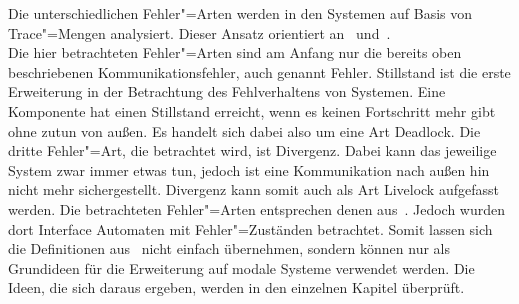 Die unterschiedlichen Fehler"=Arten werden in den Systemen auf Basis von
Trace"=Mengen analysiert. Dieser Ansatz orientiert an~\cite{Vogler2014EIO}
und~\cite{Schinko2016BA}.\\
Die hier betrachteten Fehler"=Arten sind am Anfang nur die bereits oben
beschriebenen Kommunikationsfehler, auch genannt Fehler. Stillstand ist die
erste Erweiterung in der Betrachtung des Fehlverhaltens von Systemen. Eine
Komponente hat einen Stillstand erreicht, wenn es keinen Fortschritt mehr gibt
ohne zutun von außen. Es handelt sich dabei also um eine Art Deadlock. Die
dritte Fehler"=Art, die betrachtet wird, ist Divergenz. Dabei kann das
jeweilige System zwar immer etwas tun, jedoch ist eine Kommunikation nach außen
hin nicht mehr sichergestellt. Divergenz kann somit auch als Art Livelock
aufgefasst werden. Die betrachteten Fehler"=Arten entsprechen denen
aus~\cite{Schinko2016BA}. Jedoch wurden dort Interface Automaten mit
Fehler"=Zuständen betrachtet. Somit lassen sich die Definitionen
aus~\cite{Schinko2016BA} nicht einfach übernehmen, sondern können nur als
Grundideen für die Erweiterung auf modale Systeme verwendet werden. Die Ideen,
die sich daraus ergeben, werden in den einzelnen Kapitel überprüft.
